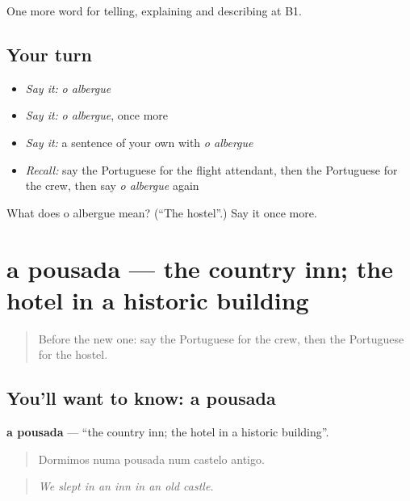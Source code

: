 \begin{grammarlens}[title={What you've built}]
One more word for telling, explaining and describing at B1.
\end{grammarlens}

\subsection*{Your turn}
\begin{itemize}
\raggedright
  \item \emph{Say it:} \emph{o albergue}
  \item \emph{Say it:} \emph{o albergue}, once more
  \item \emph{Say it:} a sentence of your own with \emph{o albergue}
  \item \emph{Recall:} say the Portuguese for the flight attendant, then the Portuguese for the crew, then say \emph{o albergue} again
\end{itemize}

\begin{tcolorbox}[breakable,colback=teal!4,colframe=teal!35!black,title={Before you move on}]
What does o albergue mean? (\textquotedblleft{}The hostel\textquotedblright{}.) Say it once more.
\end{tcolorbox}
\section[a pousada]{a pousada — the country inn; the hotel in a historic building}

\label{lesson:PT-C425-pousada}



\begin{quote}
Before the new one: say the Portuguese for the crew, then the Portuguese for the hostel.
\end{quote}

\subsection*{You'll want to know: a pousada}
\textbf{a pousada} — \textquotedblleft{}the country inn; the hotel in a historic building\textquotedblright{}.

\begin{quote}
Dormimos numa pousada num castelo antigo.
\end{quote}

\begin{quote}
\emph{We slept in an inn in an old castle.}
\end{quote}

